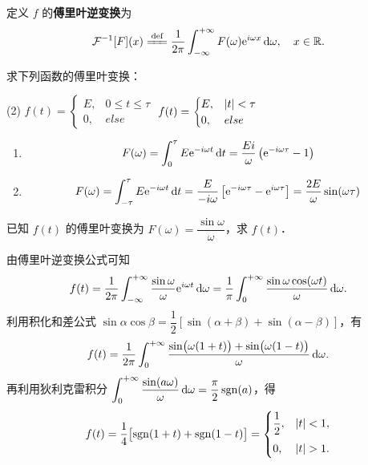 \documentclass[12pt, a4paper, oneside, UTF8]{ctexbook}
\begin{document}
\begin{definition}[傅里叶逆变换]
定义 $f$ 的\textbf{傅里叶逆变换}为
\[
\F^{-1}[F](x) \defeq \frac{1}{2\pi}\int_{-\infty}^{+\infty} F(\omega)\e^{i\omega x}\,\d\omega,\quad x\in\R.
\]
\end{definition}

\begin{example}
    求下列函数的傅里叶变换：
    \begin{tasks}[label=(\arabic*)](2)
        \task $\displaystyle f(t) = \begin{cases}
            E, & 0\le t\le \tau\\
            0, & else
            \end{cases}$
        \task $\displaystyle f(t) = \begin{cases}
            E, & \abs{t}<\tau\\
            0, & else
            \end{cases}$
    \end{tasks}
\end{example}
\begin{solution}
    \begin{enumerate}[label=(\arabic*)]
        \item \[
        F(\omega) = \int_{0}^{\tau} E\mathrm{e}^{-i\omega t}\,\mathrm{d} t = \frac{Ei}{\omega}\left(\mathrm{e}^{-i\omega\tau}-1\right)
        \]
        \item \[
        F(\omega) = \int_{-\tau}^{\tau} E\mathrm{e}^{-i\omega t}\,\mathrm{d} t = \frac{E}{-i\omega}\left[\mathrm{e}^{-i\omega\tau}-\mathrm{e}^{i\omega\tau}\right] = \frac{2E}{\omega}\sin(\omega\tau)
        \]
    \end{enumerate}
\end{solution}

\begin{example}
    已知 $f(t)$ 的傅里叶变换为 $F(\omega) = \dfrac{\sin\omega}{\omega}$，求 $f(t)$．
\end{example}
\begin{solution}
    由傅里叶逆变换公式可知
    \[
        f(t) = \frac{1}{2\pi}\int_{-\infty}^{+\infty} \frac{\sin\omega}{\omega}\mathrm{e}^{i\omega t}\,\mathrm{d}\omega = \frac{1}{\pi}\int_{0}^{+\infty} \frac{\sin\omega\cos(\omega t)}{\omega}\,\mathrm{d}\omega.
    \]
    利用积化和差公式 $\sin\alpha\cos\beta=\dfrac{1}{2}[\sin(\alpha+\beta)+\sin(\alpha-\beta)]$，有
    \[
        f(t) = \frac{1}{2\pi}\int_{0}^{+\infty} \frac{\sin\bigl(\omega(1+t)\bigr)+\sin\bigl(\omega(1-t)\bigr)}{\omega}\,\mathrm{d}\omega.
    \]
    再利用狄利克雷积分 $\displaystyle\int_{0}^{+\infty}\frac{\sin(a\omega)}{\omega}\,\mathrm{d}\omega=\frac{\pi}{2}\operatorname{sgn}(a)$，得
    \[
        f(t) = \frac{1}{4}\bigl[\operatorname{sgn}(1+t)+\operatorname{sgn}(1-t)\bigr]
        = \begin{cases}
            \dfrac{1}{2}, & \abs{t}<1,\\[0.8em]
            0, & \abs{t}>1.
        \end{cases}
    \]
\end{solution}
\end{document}
